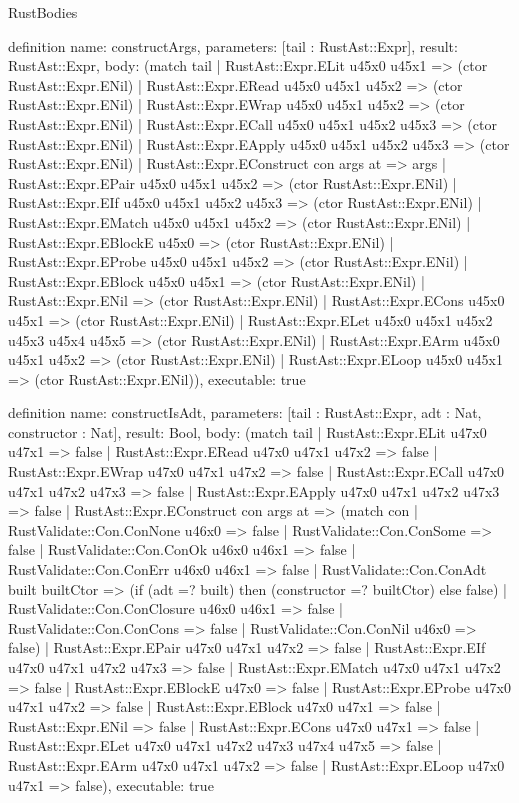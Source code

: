 \begin{lexlean}{RustBodies}
\begin{semanticmodule}
definition{
  name: constructArgs,
  parameters: [tail : RustAst::Expr],
  result: RustAst::Expr,
  body: (match tail
    | RustAst::Expr.ELit u45x0 u45x1 => (ctor RustAst::Expr.ENil)
    | RustAst::Expr.ERead u45x0 u45x1 u45x2 => (ctor RustAst::Expr.ENil)
    | RustAst::Expr.EWrap u45x0 u45x1 u45x2 => (ctor RustAst::Expr.ENil)
    | RustAst::Expr.ECall u45x0 u45x1 u45x2 u45x3 => (ctor RustAst::Expr.ENil)
    | RustAst::Expr.EApply u45x0 u45x1 u45x2 u45x3 => (ctor RustAst::Expr.ENil)
    | RustAst::Expr.EConstruct con args at => args
    | RustAst::Expr.EPair u45x0 u45x1 u45x2 => (ctor RustAst::Expr.ENil)
    | RustAst::Expr.EIf u45x0 u45x1 u45x2 u45x3 => (ctor RustAst::Expr.ENil)
    | RustAst::Expr.EMatch u45x0 u45x1 u45x2 => (ctor RustAst::Expr.ENil)
    | RustAst::Expr.EBlockE u45x0 => (ctor RustAst::Expr.ENil)
    | RustAst::Expr.EProbe u45x0 u45x1 u45x2 => (ctor RustAst::Expr.ENil)
    | RustAst::Expr.EBlock u45x0 u45x1 => (ctor RustAst::Expr.ENil)
    | RustAst::Expr.ENil => (ctor RustAst::Expr.ENil)
    | RustAst::Expr.ECons u45x0 u45x1 => (ctor RustAst::Expr.ENil)
    | RustAst::Expr.ELet u45x0 u45x1 u45x2 u45x3 u45x4 u45x5 => (ctor RustAst::Expr.ENil)
    | RustAst::Expr.EArm u45x0 u45x1 u45x2 => (ctor RustAst::Expr.ENil)
    | RustAst::Expr.ELoop u45x0 u45x1 => (ctor RustAst::Expr.ENil)),
  executable: true
}

definition{
  name: constructIsAdt,
  parameters: [tail : RustAst::Expr, adt : Nat, constructor : Nat],
  result: Bool,
  body: (match tail
    | RustAst::Expr.ELit u47x0 u47x1 => false
    | RustAst::Expr.ERead u47x0 u47x1 u47x2 => false
    | RustAst::Expr.EWrap u47x0 u47x1 u47x2 => false
    | RustAst::Expr.ECall u47x0 u47x1 u47x2 u47x3 => false
    | RustAst::Expr.EApply u47x0 u47x1 u47x2 u47x3 => false
    | RustAst::Expr.EConstruct con args at => (match con
      | RustValidate::Con.ConNone u46x0 => false
      | RustValidate::Con.ConSome => false
      | RustValidate::Con.ConOk u46x0 u46x1 => false
      | RustValidate::Con.ConErr u46x0 u46x1 => false
      | RustValidate::Con.ConAdt built builtCtor => (if (adt =? built) then (constructor =? builtCtor) else false)
      | RustValidate::Con.ConClosure u46x0 u46x1 => false
      | RustValidate::Con.ConCons => false
      | RustValidate::Con.ConNil u46x0 => false)
    | RustAst::Expr.EPair u47x0 u47x1 u47x2 => false
    | RustAst::Expr.EIf u47x0 u47x1 u47x2 u47x3 => false
    | RustAst::Expr.EMatch u47x0 u47x1 u47x2 => false
    | RustAst::Expr.EBlockE u47x0 => false
    | RustAst::Expr.EProbe u47x0 u47x1 u47x2 => false
    | RustAst::Expr.EBlock u47x0 u47x1 => false
    | RustAst::Expr.ENil => false
    | RustAst::Expr.ECons u47x0 u47x1 => false
    | RustAst::Expr.ELet u47x0 u47x1 u47x2 u47x3 u47x4 u47x5 => false
    | RustAst::Expr.EArm u47x0 u47x1 u47x2 => false
    | RustAst::Expr.ELoop u47x0 u47x1 => false),
  executable: true
}


\end{semanticmodule}
\end{lexlean}
